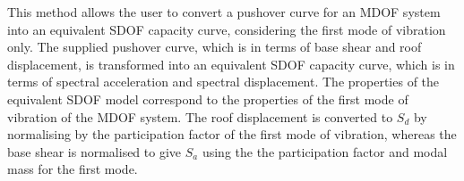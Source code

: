 This method allows the user to convert a pushover curve for an MDOF system into an equivalent SDOF capacity curve, considering the first mode of vibration only. The supplied pushover curve, which is in terms of base shear and roof displacement, is transformed into an equivalent SDOF capacity curve, which is in terms of spectral acceleration and spectral displacement. The properties of the equivalent SDOF model correspond to the properties of the first mode of vibration of the MDOF system. The roof displacement is converted to $S_d$ by normalising by the participation factor of the first mode of vibration, whereas the base shear is normalised to give $S_a$ using the the participation factor and modal mass for the first mode.